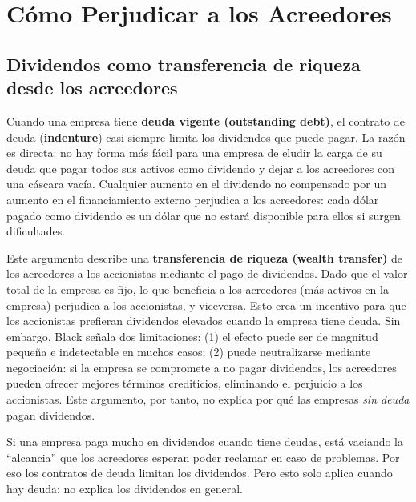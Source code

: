 \documentclass[12pt]{article}
\begin{document}
\section{C\'omo Perjudicar a los Acreedores}

\subsection{Dividendos como transferencia de riqueza desde los acreedores}

Cuando una empresa tiene \textbf{deuda vigente (outstanding debt)}, el contrato de deuda (\textbf{indenture}) casi siempre limita los dividendos que puede pagar. La raz\'on es directa: no hay forma m\'as f\'acil para una empresa de eludir la carga de su deuda que pagar todos sus activos como dividendo y dejar a los acreedores con una c\'ascara vac\'ia. Cualquier aumento en el dividendo no compensado por un aumento en el financiamiento externo perjudica a los acreedores: cada d\'olar pagado como dividendo es un d\'olar que no estar\'a disponible para ellos si surgen dificultades.

\begin{explicacion}
Este argumento describe una \textbf{transferencia de riqueza (wealth transfer)} de los acreedores a los accionistas mediante el pago de dividendos. Dado que el valor total de la empresa es fijo, lo que beneficia a los acreedores (m\'as activos en la empresa) perjudica a los accionistas, y viceversa. Esto crea un incentivo para que los accionistas prefieran dividendos elevados cuando la empresa tiene deuda. Sin embargo, Black se\~nala dos limitaciones: (1) el efecto puede ser de magnitud peque\~na e indetectable en muchos casos; (2) puede neutralizarse mediante negociaci\'on: si la empresa se compromete a no pagar dividendos, los acreedores pueden ofrecer mejores t\'erminos crediticios, eliminando el perjuicio a los accionistas. Este argumento, por tanto, no explica por qu\'e las empresas \textit{sin deuda} pagan dividendos.
\end{explicacion}

\begin{intuicion}
Si una empresa paga mucho en dividendos cuando tiene deudas, est\'a vaciando la ``alcancia'' que los acreedores esperan poder reclamar en caso de problemas. Por eso los contratos de deuda limitan los dividendos. Pero esto solo aplica cuando hay deuda: no explica los dividendos en general.
\end{intuicion}
\end{document}
